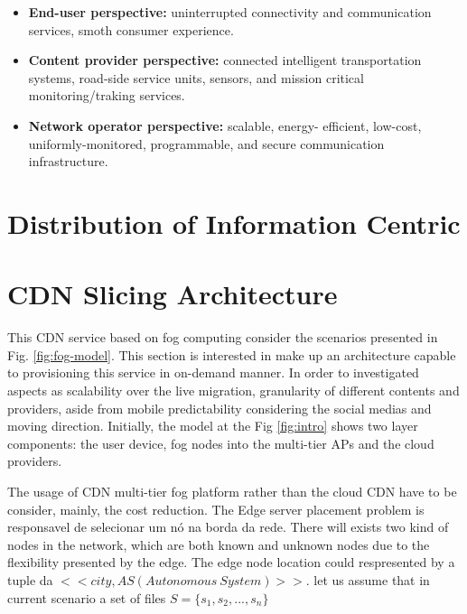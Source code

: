 \begin{itemize}

\item \textbf{End-user perspective:} uninterrupted connectivity and communication services, smoth consumer experience.

\item \textbf{Content provider perspective:} connected intelligent 	transportation systems, road-side service units, sensors, and mission critical monitoring/traking services.

\item \textbf{Network operator perspective:}  scalable, energy- efficient, low-cost, uniformly-monitored, programmable, and secure communication infrastructure.

\end{itemize}



\section{Distribution of Information Centric}


\section{CDN Slicing Architecture}
\label{sec:cdn-slicing-archi}

This CDN service based on fog computing consider the scenarios presented in Fig. \ref{fig:fog-model}. This section is interested in make up an architecture capable to provisioning this service in on-demand manner. In order to investigated aspects as scalability over the live migration, granularity of different contents and providers, aside from mobile predictability considering the social medias and moving direction. Initially, the model at the Fig \ref{fig:intro} shows two layer components: the user device, fog nodes into the multi-tier APs and the cloud providers. 

The usage of CDN multi-tier fog platform rather than the cloud CDN have to be consider, mainly, the cost reduction.
The Edge server placement problem is responsavel de selecionar um nó na borda da rede. 
There will exists two kind of nodes in the network, which are both known and unknown nodes due to the flexibility presented by the edge. The edge node location could respresented by a tuple da $<< city, AS(Autonomous\ System)>>$. let us assume that in current scenario a set of files $S = \{s_{1}, s_{2}, ..., s_{n}\}$ 

